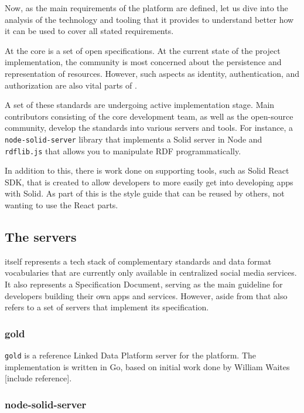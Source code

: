 Now, as the main requirements of the \lpa{} platform are defined, let us dive into the analysis of the \solid{} technology and tooling that it provides to understand better how it can be used to cover all stated requirements.

At the core \solid{} is a set of open specifications. At the current state of the project implementation, the community is most concerned about the persistence and representation of resources. However, such aspects as identity, authentication, and authorization are also vital parts of \solid{}.

A set of these standards are undergoing active implementation stage. Main contributors consisting of the core \solid{} development team, as well as the open-source community, develop the standards into various servers and tools. For instance, a \texttt{node-solid-server} library that implements a Solid server in Node and \texttt{rdflib.js} that allows you to manipulate RDF programmatically.

In addition to this, there is work done on supporting tools, such as Solid React SDK, that is created to allow developers to more easily get into developing apps with Solid. As part of this is the style guide that can be reused by others, not wanting to use the React parts.

\subsection{The \solid{} servers}

\solid{} itself represents a tech stack of complementary standards and data format vocabularies that are currently only available in centralized social media services. It also represents a Specification Document, serving as the main guideline for developers building their own apps and services. However, aside from that \solid{} also refers to a set of servers that implement its specification. 

\subsubsection{gold}

\texttt{gold} is a reference Linked Data Platform server for the \solid{} platform. The implementation is written in Go, based on initial work done by William Waites [include reference].

\subsubsection{node-solid-server}


